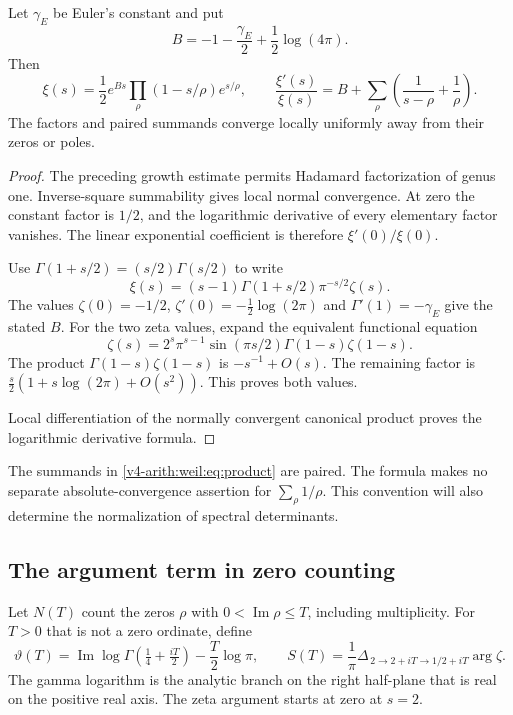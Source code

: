 \begin{proposition}
\label{v4-arith:weil:prop:product}
Let \(\gamma_E\) be Euler's constant and put
\[
 B=-1-\frac{\gamma_E}{2}+\frac12\log(4\pi).
\]
Then
\begin{equation}
 \xi(s)=\frac12e^{Bs}
       \prod_\rho(1-s/\rho)e^{s/\rho},\qquad
 \frac{\xi'(s)}{\xi(s)}
       =B+\sum_\rho\left(\frac1{s-\rho}+\frac1\rho\right).
 \label{v4-arith:weil:eq:product}
\end{equation}
The factors and paired summands converge locally uniformly away from
their zeros or poles.
\end{proposition}
\begin{proof}
The preceding growth estimate permits Hadamard factorization of genus
one. Inverse-square summability gives local normal convergence.
At zero the constant factor is \(1/2\), and the logarithmic derivative
of every elementary factor vanishes. The linear exponential coefficient
is therefore \(\xi'(0)/\xi(0)\).

Use \(\Gamma(1+s/2)=(s/2)\Gamma(s/2)\) to write
\[
 \xi(s)=(s-1)\Gamma(1+s/2)\pi^{-s/2}\zeta(s).
\]
The values \(\zeta(0)=-1/2\), \(\zeta'(0)=-\tfrac12\log(2\pi)\)
and \(\Gamma'(1)=-\gamma_E\) give the stated \(B\).
For the two zeta values, expand the equivalent functional equation
\[
 \zeta(s)=2^s\pi^{s-1}\sin(\pi s/2)\Gamma(1-s)\zeta(1-s).
\]
The product \(\Gamma(1-s)\zeta(1-s)\) is \(-s^{-1}+O(s)\).
The remaining factor is
\(\tfrac s2(1+s\log(2\pi)+O(s^2))\).
This proves both values.

Local differentiation of the normally
convergent canonical product proves the logarithmic derivative formula.
\end{proof}

The summands in \eqref{v4-arith:weil:eq:product} are paired.
The formula makes no separate absolute-convergence assertion for
\(\sum_\rho1/\rho\). This convention will also determine the normalization
of spectral determinants.

\subsection{The argument term in zero counting}

Let \(N(T)\) count the zeros \(\rho\) with
\(0<\operatorname{Im}\rho\le T\), including multiplicity.
For \(T>0\) that is not a zero ordinate, define
\[
 \vartheta(T)=
 \operatorname{Im}\log\Gamma(\tfrac14+\tfrac{iT}{2})
                -\frac T2\log\pi,\qquad
 S(T)=\frac1\pi\Delta_{\,2\to2+iT\to1/2+iT}\arg\zeta.
\]
The gamma logarithm is the analytic branch on the right half-plane
that is real on the positive real axis. The zeta argument starts
at zero at \(s=2\).

